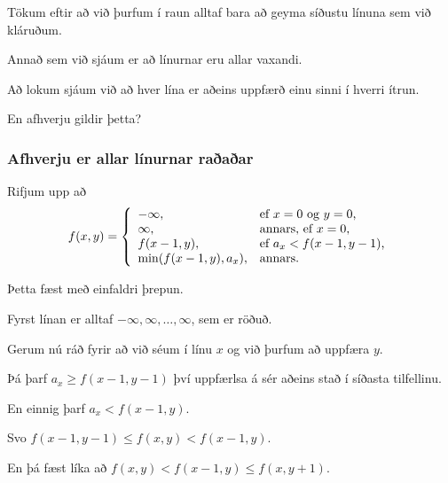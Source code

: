 {	\only<all:109> \lisbuED
	\only<all:110> \lisbuEE
	\only<all:111> \lisbuEF
	\only<all:112> \lisbuEG
	\only<all:113> \lisbuEH
	\only<all:114> \lisbuEI
	\only<all:115> \lisbuEJ
	\only<all:116> \lisbuEK
	\only<all:117> \lisbuEL
	\only<all:118> \lisbuEM
	\only<all:119> \lisbuEN
	\only<all:120> \lisbuEO
	\only<all:121> \lisbuEP
	\only<all:122> \lisbuEQ
	\only<all:123> \lisbuER
	\only<all:124> \lisbuES
	\only<all:125> \lisbuET
	\only<all:126> \lisbuEU
	\only<all:127> \lisbuEV
	\only<all:128> \lisbuEW
	\only<all:129> \lisbuEX
	\only<all:130> \lisbuEY
	\only<all:131> \lisbuEZ
	\only<all:132> \lisbuFA
	\only<all:133> \lisbuFB
	\only<all:134> \lisbuFC
	\only<all:135> \lisbuFD
	\only<all:136> \lisbuFE
	\only<all:137> \lisbuFF
	\only<all:138> \lisbuFG
	\only<all:139> \lisbuFH
	\only<all:140> \lisbuFI
	\only<all:141> \lisbuFJ
	\only<all:142> \lisbuFK
	\only<all:143> \lisbuFL
	\only<all:144> \lisbuFM
	\only<all:145> \lisbuFN
	\only<all:146> \lisbuFO
	\only<all:147> \lisbuFP
	\only<all:148> \lisbuFQ
	\only<all:149> \lisbuFR
	\only<all:150> \lisbuFS
	\only<all:151> \lisbuFT
	\only<all:152> \lisbuFU
	\only<all:153> \lisbuFV
	\only<all:154> \lisbuFW
	\only<all:155> \lisbuFX
	\only<all:156> \lisbuFY
	\only<all:157> \lisbuFZ
	\only<all:158> \lisbuGA
	\only<all:159> \lisbuGB
	\only<all:160> \lisbuGC
	\only<all:161> \lisbuGD
	\only<all:162> \lisbuGE
	\only<all:163> \lisbuGF
	\only<all:164> \lisbuGG
	\only<all:165> \lisbuGH
}

{
	{
		\item<1-> Tökum eftir að við þurfum í raun alltaf bara að geyma síðustu línuna sem við kláruðum.
		\item<2-> Annað sem við sjáum er að línurnar eru allar vaxandi.
		\item<3-> Að lokum sjáum við að hver lína er aðeins uppfærð einu sinni í hverri ítrun.
		\item<4-> En afhverju gildir þetta?
	}
}

{
	\frametitle{Afhverju er allar línurnar raðaðar}
	{
		\item<1-> Rifjum upp að
		\[
			f(x, y) = \left \{
			\env{array}
			{ {l l}
				-\infty, & \text{ef $x = 0$ og $y = 0$,} \\
				\infty, & \text{annars, ef $x = 0$,} \\
				f(x - 1, y), & \text{ef $a_x < f(x - 1, y - 1)$,} \\
				\min(f(x - 1, y), a_x), & \text{annars.}
			}
			\right .
		\]
		\item<2-> Þetta fæst með einfaldri þrepun.
		\item<3-> Fyrst línan er alltaf $-\infty, \infty, \dots, \infty$, sem er röðuð.
		\item<4-> Gerum nú ráð fyrir að við séum í línu $x$ og við þurfum að uppfæra $y$.
		\item<5-> Þá þarf $a_x \geq f(x - 1, y - 1)$ því uppfærlsa á sér aðeins stað í síðasta tilfellinu.
		\item<6-> En einnig þarf $a_x < f(x - 1, y)$.
		\item<7-> Svo $f(x - 1, y - 1) \leq f(x, y) < f(x - 1, y)$.
		\item<8-> En þá fæst líka að $f(x, y) < f(x - 1,y) \leq f(x, y + 1)$.
	}
}

